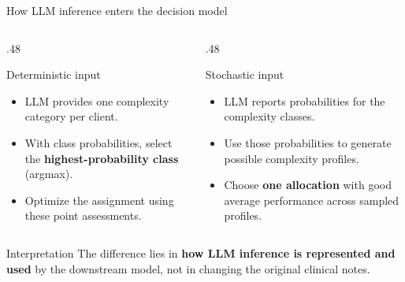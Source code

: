 \documentclass[aspectratio=169,11pt]{beamer}
\newcommand{\key}[1]{\textcolor{deepblue}{\textbf{#1}}}
\begin{document}
\begin{frame}{How LLM inference enters the decision model}

\begin{columns}[T,onlytextwidth]

\begin{column}{.48\textwidth}

\begin{block}{Deterministic input}

\begin{itemize}
\setlength{\itemsep}{6pt}

\item LLM provides one complexity category per client.

\item With class probabilities, select the \key{highest-probability class} (argmax).

\item Optimize the assignment using these point assessments.

\end{itemize}

\end{block}

\end{column}

\begin{column}{.48\textwidth}

\begin{block}{Stochastic input}

\begin{itemize}
\setlength{\itemsep}{6pt}

\item LLM reports probabilities for the complexity classes.

\item Use those probabilities to generate possible complexity profiles.

\item Choose \key{one allocation} with good average performance across sampled profiles.

\end{itemize}

\end{block}

\end{column}

\end{columns}

\vspace{.3cm}

\begin{alertblock}{Interpretation}
The difference lies in \key{how LLM inference is represented and used} by the downstream model, not in changing the original clinical notes.
\end{alertblock}

\end{frame}
\end{document}
